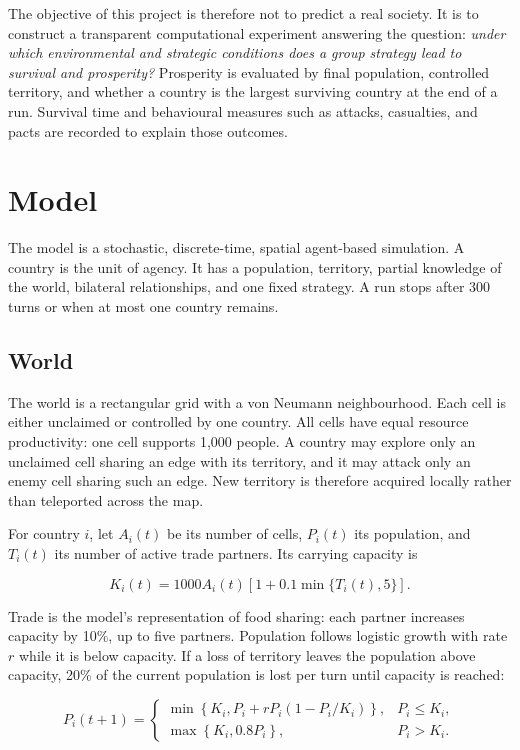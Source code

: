 \documentclass[10pt,twocolumn]{article}
\begin{document}
The objective of this project is therefore not to predict a real society.
It is to construct a transparent computational experiment answering the
question: \emph{under which environmental and strategic conditions does a
group strategy lead to survival and prosperity?}  Prosperity is evaluated by
final population, controlled territory, and whether a country is the largest
surviving country at the end of a run.  Survival time and behavioural measures
such as attacks, casualties, and pacts are recorded to explain those outcomes.

\section{Model}

The model is a stochastic, discrete-time, spatial agent-based simulation.  A
country is the unit of agency.  It has a population, territory, partial
knowledge of the world, bilateral relationships, and one fixed strategy.  A
run stops after 300 turns or when at most one country remains.

\subsection{World}

The world is a rectangular grid with a von Neumann neighbourhood.  Each cell
is either unclaimed or controlled by one country.  All cells have equal
resource productivity: one cell supports 1,000 people.  A country may explore
only an unclaimed cell sharing an edge with its territory, and it may attack
only an enemy cell sharing such an edge.  New territory is therefore acquired
locally rather than teleported across the map.

For country $i$, let $A_i(t)$ be its number of cells, $P_i(t)$ its population,
and $T_i(t)$ its number of active trade partners.  Its carrying capacity is

\begin{equation}
K_i(t)=1000 A_i(t)\left[1+0.1\min\{T_i(t),5\}\right].
\end{equation}

Trade is the model's representation of food sharing: each partner increases
capacity by 10\%, up to five partners.  Population follows logistic growth
with rate $r$ while it is below capacity.  If a loss of territory leaves the
population above capacity, 20\% of the current population is lost per turn
until capacity is reached:

\begin{equation}
P_i(t+1)=
\begin{cases}
\min\!\left\{K_i, P_i+rP_i\left(1-P_i/K_i\right)\right\}, & P_i\le K_i,\\
\max\!\left\{K_i,0.8P_i\right\}, & P_i>K_i.
\end{cases}
\end{equation}
\end{document}
